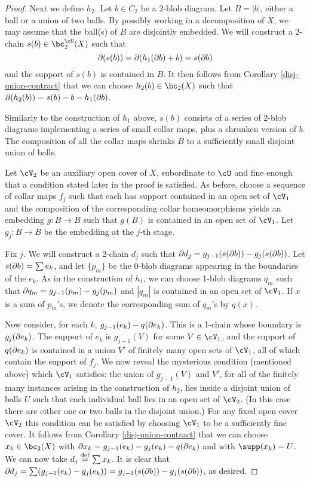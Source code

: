 \begin{proof}
Next we define $h_2$.
Let $b\in C_2$ be a 2-blob diagram.
Let $B = |b|$, either a ball or a union of two balls.
By possibly working in a decomposition of $X$, we may assume that the ball(s)
of $B$ are disjointly embedded.
We will construct a 2-chain $s(b)\in \sbc_2(X)$ such that
\[
	\partial(s(b)) = \partial(h_1(\partial b) + b) = s(\partial b)
\]
and the support of $s(b)$ is contained in $B$.
It then follows from Corollary \ref{disj-union-contract} that we can choose
$h_2(b) \in \bc_2(X)$ such that $\partial(h_2(b)) = s(b) - b - h_1(\partial b)$.

Similarly to the construction of $h_1$ above, 
$s(b)$ consists of a series of 2-blob diagrams implementing a series
of small collar maps, plus a shrunken version of $b$.
The composition of all the collar maps shrinks $B$ to a sufficiently small 
disjoint union of balls.

Let $\cV_2$ be an auxiliary open cover of $X$, subordinate to $\cU$ and 
fine enough that a condition stated later in the proof is satisfied.
As before, choose a sequence of collar maps $f_j$ 
such that each has support
contained in an open set of $\cV_1$ and the composition of the corresponding collar homeomorphisms
yields an embedding $g:B\to B$ such that $g(B)$ is contained in an open set of $\cV_1$.
Let $g_j:B\to B$ be the embedding at the $j$-th stage.

Fix $j$.
We will construct a 2-chain $d_j$ such that $\partial d_j = g_{j-1}(s(\partial b)) - g_{j}(s(\partial b))$.
Let $s(\partial b) = \sum e_k$, and let $\{p_m\}$ be the 0-blob diagrams
appearing in the boundaries of the $e_k$.
As in the construction of $h_1$, we can choose 1-blob diagrams $q_m$ such that
$\partial q_m = g_{j-1}(p_m) - g_j(p_m)$ and $|q_m|$ is contained in an open set of $\cV_1$.
If $x$ is a sum of $p_m$'s, we denote the corresponding sum of $q_m$'s by $q(x)$.

Now consider, for each $k$, $g_{j-1}(e_k) - q(\partial e_k)$.
This is a 1-chain whose boundary is $g_j(\partial e_k)$.
The support of $e_k$ is $g_{j-1}(V)$ for some $V\in \cV_1$, and
the support of $q(\partial e_k)$ is contained in a union $V'$ of finitely many open sets
of $\cV_1$, all of which contain the support of $f_j$.
We now reveal the mysterious condition (mentioned above) which $\cV_1$ satisfies:
the union of $g_{j-1}(V)$ and $V'$, for all of the finitely many instances
arising in the construction of $h_2$, lies inside a disjoint union of balls $U$
such that each individual ball lies in an open set of $\cV_2$.
(In this case there are either one or two balls in the disjoint union.)
For any fixed open cover $\cV_2$ this condition can be satisfied by choosing $\cV_1$ 
to be a sufficiently fine cover.
It follows from Corollary \ref{disj-union-contract} that we can choose 
$x_k \in \bc_2(X)$ with $\partial x_k = g_{j-1}(e_k) - g_j(e_k) - q(\partial e_k)$
and with $\supp(x_k) = U$.
We can now take $d_j \stackrel{\mathrm{def}}{=} \sum x_k$.
It is clear that $\partial d_j = \sum (g_{j-1}(e_k) - g_j(e_k)) = g_{j-1}(s(\partial b)) - g_{j}(s(\partial b))$, as desired.


\end{proof}
